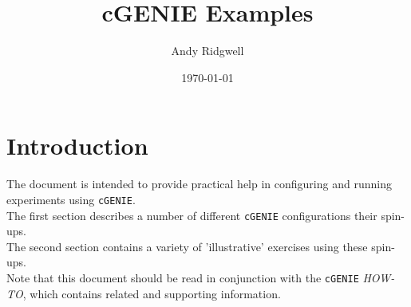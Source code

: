 \documentclass[10pt,twoside]{article}
\title{cGENIE Examples}
\author{Andy Ridgwell}
\date{\today}
\begin{document}

\maketitle



\tableofcontents






\newpage
\section{Introduction}\label{Introduction}

The document is intended to provide practical help in configuring and running experiments using \texttt{cGENIE}.
\\The first section describes a number of different \texttt{cGENIE} configurations their spin-ups. 
\\The second section contains a variety of 'illustrative' exercises using these spin-ups.
\\Note that this document should be read in conjunction with the \texttt{cGENIE} \textit{HOW-TO}, which contains related and supporting information.
\end{document}
